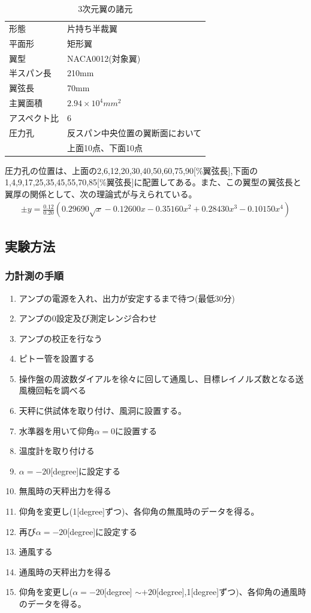 \documentclass[a4j,twoside,openright,11pt]{jarticle}
\begin{document}
\begin{table}[htb]
\begin{center}
  \caption{3次元翼の諸元}
  \begin{tabular}{ll} \hline
形態&片持ち半裁翼\\
平面形&矩形翼\\
翼型&NACA0012(対象翼)\\
半スパン長&210mm\\
翼弦長&70mm\\
主翼面積&$2.94 \times 10^{4}mm^2$\\
アスペクト比&6\\
圧力孔&反スパン中央位置の翼断面において\\
&上面10点、下面10点\\
\hline
  \end{tabular}
\end{center}
\end{table}
圧力孔の位置は、上面の2,6,12,20,30,40,50,60,75,90[\%翼弦長],下面の1,4,9,17,25,35,45,55,70,85[\%翼弦長]に配置してある。また、この翼型の翼弦長と翼厚の関係として、次の理論式が与えられている。
\begin{eqnarray}
\pm y = \frac{0.12}{0.20}\left(0.29690\sqrt{x} -0.12600x -0.35160x^2 +0.28430x^3 -0.10150x^4 \right)
\end{eqnarray}

\subsection{実験方法}
\subsubsection{力計測の手順}

\begin{enumerate}
\item アンプの電源を入れ、出力が安定するまで待つ(最低30分)
\item アンプの0設定及び測定レンジ合わせ
\item アンプの校正を行なう
\item ピトー管を設置する
\item 操作盤の周波数ダイアルを徐々に回して通風し、目標レイノルズ数となる送風機回転を調べる
\item 天秤に供試体を取り付け、風洞に設置する。
\item 水準器を用いて仰角$\alpha = 0$に設置する
\item 温度計を取り付ける
\item $\alpha = -20$[degree]に設定する
\item 無風時の天秤出力を得る
\item 仰角を変更し(1[degree]ずつ)、各仰角の無風時のデータを得る。
\item 再び$\alpha = -20$[degree]に設定する
\item 通風する
\item 通風時の天秤出力を得る
\item 仰角を変更し($\alpha = -20$[degree] $\sim +20$[degree],1[degree]ずつ)、各仰角の通風時のデータを得る。
\end{enumerate}
\end{document}
